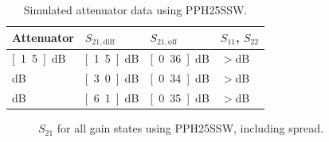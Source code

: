 		\begin{table}[h!]
			\caption{Simulated attenuator data using PPH25SSW.}
			\label{tab:VarGainData}
			\centering
			\begin{tabular}{ l l l l } \toprule
				Attenuator & 	$S_{21,\text{diff}}$ &	$S_{21,\text{off}}$ &  $S_{11}$, $S_{22}$ \\\midrule
				\unit[1.5]{dB} & \unit[1.5]{dB}	&	\unit[0.36]{dB} & $>$\unit[25]{dB} \\
				\unit[3]{dB} & \unit[3.0]{dB}	&	\unit[0.34]{dB} & $>$\unit[25]{dB} \\
				\unit[6]{dB} & \unit[6.1]{dB}	&	\unit[0.35]{dB} & $>$\unit[21]{dB} \\\bottomrule
			\end{tabular}
		\end{table}





		\begin{figure}[h!]
			\centering
			\caption[Spread for all gain-states]{$S_{21}$ for all gain states using PPH25SSW, including spread.}\label{fig:All_attenuators_spread}
		\end{figure}


		
		


